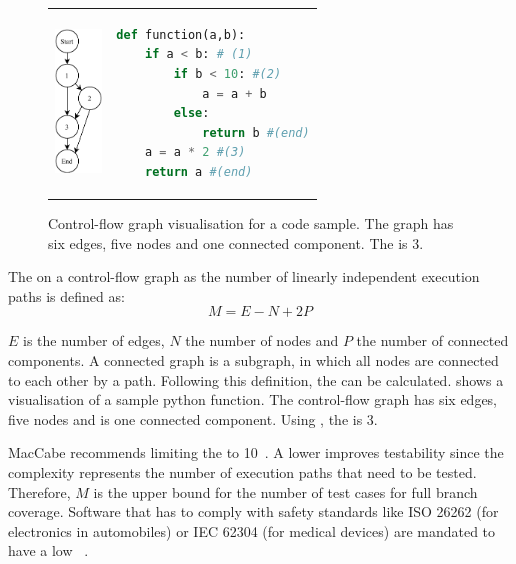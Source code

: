 \begin{figure}
\begin{tabular}{p{}p{}}
    \begin{minipage}{0.45\textwidth}
        \centering
    \includegraphics[height=1.5in]{img/Background/control-flow-graph.pdf}
    \label{fig:background_control_flow_graph_image}
    \end{minipage}
&
\begin{minipage}[c]{0.45\textwidth}
\centering
\begin{lstlisting}[language=Python, label=lst:background_control_flow_graph_listing]
def function(a,b):
    if a < b: # (1)
        if b < 10: #(2)
            a = a + b
        else:
            return b #(end)
    a = a * 2 #(3)
    return a #(end)
\end{lstlisting}
\end{minipage}
\end{tabular}
\caption{Control-flow graph visualisation for a code sample. The graph has six edges, five nodes and one connected component. The  is 3.}
\label{fig:background_control_flow_graph}
\end{figure}

The  on a control-flow graph as the number of linearly independent execution paths is defined as:
\begin{equation}\label{eq:cyclomatic_complexity}
M = E - N + 2P
\end{equation}

$E$ is the number of edges, $N$ the number of nodes and $P$ the number of connected components.  A connected graph is a subgraph, in which all nodes are connected to each other by a path. Following this definition, the  can be calculated.  shows a visualisation of a sample python function. The control-flow graph has six edges, five nodes and is one connected component. Using , the  is 3.

MacCabe recommends limiting the  to 10~\cite{mccabe_complexity_1976}. A lower  improves testability since the complexity represents the number of execution paths that need to be tested. Therefore, $M$ is the upper bound for the number of test cases for full branch coverage. 
Software that has to comply with safety standards like ISO 26262 (for electronics in automobiles) or IEC 62304 (for medical devices) are mandated to have a low ~\cite{isotc_22sc_32_iso_2018, isotc_210_iec_2006}.

